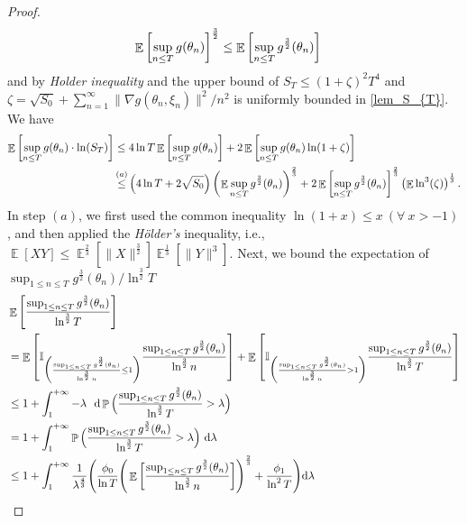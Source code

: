 \documentclass[standalone]{article}
\newcommand{\I}{\mathbb{I}}
\DeclareMathOperator{\Expect}{\mathbb{E}}
\DeclareMathOperator{\Pro}{\mathbb{P}}
\begin{document}
\begin{proof}
\begin{align}
\Expect\left[\sup_{n\le T}g(\theta_{n}) \right]^{\frac{3}{2}} & \leq \Expect\left[\sup_{n\le T}g^{\frac{3}{2}}(\theta_{n}) \right] \notag 
 \end{align}
and by \emph{Holder inequality} and the upper bound of $S_T \leq \left(1+\zeta\right)^2T^4$ and $\zeta = \sqrt{S_{0}}+\sum_{n=1}^{\infty}\|\nabla g(\theta_{n},\xi_{n})\|^{2}/n^2$ is uniformly bounded in \cref{lem_S_{T}}. We have 
\begin{align}\label{inequ:glnST}
\Expect\left[\sup_{n\le T}g(\theta_{n}) \cdot \ln(S_T)\right] & \leq 4\ln T\Expect\left[\sup_{n\le T}g(\theta_{n}) \right] + 2\Expect\left[\sup_{n\le T}g(\theta_{n})\ln( 1+\zeta) \right] \notag \\
& \mathop{\leq}^{(a)} \left(4\ln T + 2\sqrt{S_0} \right)\left(\Expect\sup_{n\le T}g^{\frac{3}{2}}(\theta_{n})\right)^{\frac{2}{3}} +2\Expect\left[\sup_{n\le T}g^{\frac{3}{2}}(\theta_{n})\right]^{\frac{2}{3}}   \left(\Expect\ln^{3}(\zeta)\right)^{\frac{1}{3}}. 
\end{align}
In step $(a)$, we first used the common inequality $\ln(1+x)\le x\ (\forall\ x>-1)$, and then applied the \emph{Hölder's} inequality, i.e., $\Expect[XY]\le \Expect^{\frac{2}{3}}[\|X\|^{\frac{3}{2}}]\Expect^{\frac{1}{3}}[\|Y\|^{3}].$ Next, we bound the expectation of $\sup_{1\le n\le T}{g^{\frac{3}{2}}(\theta_{n})/\ln^{\frac{3}{2}} T}$
{\begin{align}\label{jrnjrn_0}
&\Expect\left[\frac{\sup_{1\le n\le T}{g^{\frac{3}{2}}(\theta_{n})}}{\ln^{\frac{3}{2}}T}\right]\notag\\
&=\Expect\left[\I_{\bigg(\frac{\sup_{1\le n\le T}{g^{\frac{3}{2}}(\theta_{n})}}{\ln^{\frac{3}{2}}n}\le 1\bigg)}\frac{\sup_{1\le n\le T}{g^{\frac{3}{2}}(\theta_{n})}}{\ln^{\frac{3}{2}}n}\right]+\Expect\left[\I_{\bigg(\frac{\sup_{1\le n\le T}{g^{\frac{3}{2}}(\theta_{n})}}{\ln^{\frac{3}{2}}n}>1\bigg)}\frac{\sup_{1\le n\le T}{g^{\frac{3}{2}}(\theta_{n})}}{\ln^{\frac{3}{2}} T}\right]\notag\\
&\le 1+\int_{1}^{+\infty}-\lambda\ \ \text{d} \Pro\Big(\frac{\sup_{1\le n\le T}{g^{\frac{3}{2}}(\theta_{n})}}{\ln^{\frac{3}{2}} T}>\lambda\Big)\notag\\
&=1+\int_{1}^{+\infty}\Pro\Big(\frac{\sup_{1\le n\le T}{g^{\frac{3}{2}}(\theta_{n})}}{\ln^{\frac{3}{2}} T}>\lambda\Big) \ \text{d} \lambda\notag\\
&\le 1+\int_{1}^{+\infty}\frac{1}{\lambda^{\frac{4}{3}}}\Bigg(\frac{\phi_{0}}{\ln T}\Bigg(\Expect\bigg[\frac{\sup_{1\le n\le T}{g^{\frac{3}{2}}(\theta_{n})}}{\ln^{\frac{3}{2}}n}\bigg]\Bigg)^{\frac{2}{3}}+\frac{\phi_{1}}{\ln^2 T}\Bigg)\text{d}\lambda \notag\\

\end{align}}
\end{proof}
\end{document}
